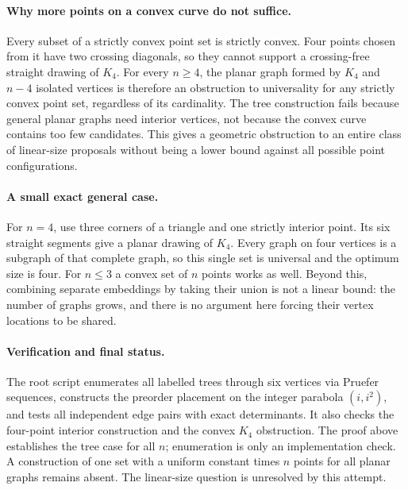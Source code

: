 \documentclass[11pt,a4paper]{article}
\begin{document}
\paragraph{Why more points on a convex curve do not suffice.}
Every subset of a strictly convex point set is strictly
convex. Four points chosen from it have two crossing
diagonals, so they cannot support a crossing-free straight
drawing of $K_4$. For every $n\ge4$, the planar graph formed
by $K_4$ and $n-4$ isolated vertices is therefore an
obstruction to universality for any strictly convex point
set, regardless of its cardinality. The tree construction
fails because general planar graphs need interior vertices,
not because the convex curve contains too few candidates.
This gives a geometric obstruction to an entire class of
linear-size proposals without being a lower bound against
all possible point configurations.

\paragraph{A small exact general case.}
For $n=4$, use three corners of a triangle and one strictly
interior point. Its six straight segments give a planar
drawing of $K_4$. Every graph on four vertices is a subgraph
of that complete graph, so this single set is universal
and the optimum size is four. For $n\le3$ a convex set of
$n$ points works as well. Beyond this, combining separate
embeddings by taking their union is not a linear bound:
the number of graphs grows, and there is no argument here
forcing their vertex locations to be shared.

\paragraph{Verification and final status.}
The root script enumerates all labelled trees through six
vertices via Pruefer sequences, constructs the preorder
placement on the integer parabola $(i,i^2)$, and tests all
independent edge pairs with exact determinants. It also
checks the four-point interior construction and the convex
$K_4$ obstruction. The proof above establishes the tree
case for all $n$; enumeration is only an implementation
check. A construction of one set with a uniform constant
times $n$ points for all planar graphs remains absent.
The linear-size question is unresolved by this attempt.
\end{document}
